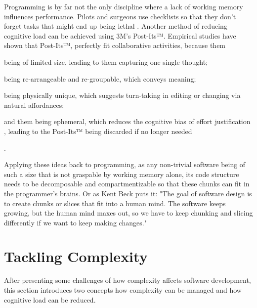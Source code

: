 Programming is by far not the only discipline where a lack of working memory influences performance.
Pilots and surgeons use checklists so that they don't forget tasks that might end up being lethal \cite{seemann_code_2021}.
Another method of reducing cognitive load can be achieved using 3M's Post-Its™.
Empirical studies \cite{digiano_learning_nodate, dove_grouping_2018} have shown that Post-Its™, perfectly fit collaborative activities, because them
\begin{enumerate*}[label=(\roman*)]
\item being of limited size, leading to them capturing one single thought;
\item being re-arrangeable and re-groupable, which conveys meaning;
\item being physically unique, which suggests turn-taking in editing or changing via natural affordances;
\item and them being ephemeral, which reduces the cognitive bias of effort justification \cite{norton_ikea_2012}, leading to the Post-Its™ being discarded if no longer needed
\end{enumerate*}.

Applying these ideas back to programming, as any non-trivial software being of such a size that is not graspable by working memory alone, its code structure needs to be decomposable and compartmentizable so that these chunks can fit in the programmer's brains.
Or as Kent Beck puts it: "The goal of software design is to create chunks or slices that fit into a human mind. The software keeps growing, but the human mind maxes out, so we have to keep chunking and slicing differently if we want to keep making changes." \cite{beck_goal_2021}


\section{Tackling Complexity}
\label{sec:tackling-complexity}
After presenting some challenges of how complexity affects software development, this section introduces two concepts how complexity can be managed and how cognitive load can be reduced.

